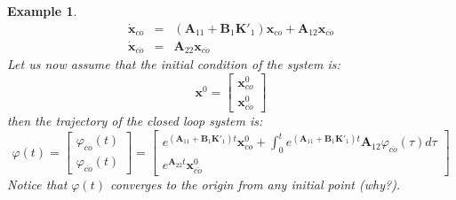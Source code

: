 \documentclass[a4paper,10pt,oneside]{book}
\newtheorem{example}{Example}
\begin{document}
\begin{example}
\begin{eqnarray}
 \dot{\mathbf{x}}_{co}&=&(\mathbf{A}_{11}+\mathbf{B}_1\mathbf{K}'_1)\mathbf{x}_{co}+\mathbf{A}_{12}\mathbf{x}_{\overline{co}}\\
 \dot{\mathbf{x}}_{\overline{co}} &=& \mathbf{A}_{22}\mathbf{x}_{\overline{co}}
\end{eqnarray}
Let us now assume that the initial condition of the system is:
\begin{equation}
 \mathbf{x}^{0}=\left[ {\begin{array}{c}
      \mathbf{x}_{co}^0 \\ 
      \mathbf{x}_{\overline{co}}^0
\end{array} } \right]
\end{equation}
then the trajectory of the closed loop system is:
\begin{equation}
 \varphi(t)=\left[ {\begin{array}{c}
      \varphi_{co}(t) \\ 
      \varphi_{\overline{co}}(t)
\end{array} } \right]=
\left[ {\begin{array}{c}
      e^{(\mathbf{A}_{11}+\mathbf{B}_1\mathbf{K}'_1)t}\mathbf{x}_{co}^0+\int_0^t e^{(\mathbf{A}_{11}+\mathbf{B}_1\mathbf{K}'_1)t}\mathbf{A}_{12}\varphi_{\overline{co}}(\tau)d\tau \\ 
      e^{\mathbf{A}_{22}t}\mathbf{x}_{\overline{co}}^0
\end{array} } \right]
\end{equation}
Notice that $\varphi(t)$ converges to the origin from any initial point (why?).
\end{example}
\end{document}
